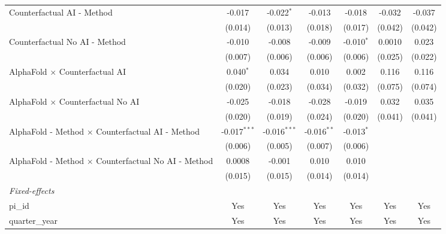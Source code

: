 \begin{tabular}{lcccccc}
   Counterfactual AI - Method                                 & -0.017         & -0.022$^{*}$   & -0.013        & -0.018       & -0.032  & -0.037\\   
                                                              & (0.014)        & (0.013)        & (0.018)       & (0.017)      & (0.042) & (0.042)\\   
   Counterfactual No AI - Method                              & -0.010         & -0.008         & -0.009        & -0.010$^{*}$ & 0.0010  & 0.023\\   
                                                              & (0.007)        & (0.006)        & (0.006)       & (0.006)      & (0.025) & (0.022)\\   
   AlphaFold $\times$ Counterfactual AI                       & 0.040$^{*}$    & 0.034          & 0.010         & 0.002        & 0.116   & 0.116\\   
                                                              & (0.020)        & (0.023)        & (0.034)       & (0.032)      & (0.075) & (0.074)\\   
   AlphaFold $\times$ Counterfactual No AI                    & -0.025         & -0.018         & -0.028        & -0.019       & 0.032   & 0.035\\   
                                                              & (0.020)        & (0.019)        & (0.024)       & (0.020)      & (0.041) & (0.041)\\   
   AlphaFold - Method $\times$ Counterfactual AI - Method     & -0.017$^{***}$ & -0.016$^{***}$ & -0.016$^{**}$ & -0.013$^{*}$ &         &   \\   
                                                              & (0.006)        & (0.005)        & (0.007)       & (0.006)      &         &   \\   
   AlphaFold - Method $\times$ Counterfactual No AI - Method  & 0.0008         & -0.001         & 0.010         & 0.010        &         &   \\   
                                                              & (0.015)        & (0.015)        & (0.014)       & (0.014)      &         &   \\   
   \midrule
   \emph{Fixed-effects}\\
   pi\_id                                                     & Yes            & Yes            & Yes           & Yes          & Yes     & Yes\\  
   quarter\_year                                              & Yes            & Yes            & Yes           & Yes          & Yes     & Yes\\  

\end{tabular}
